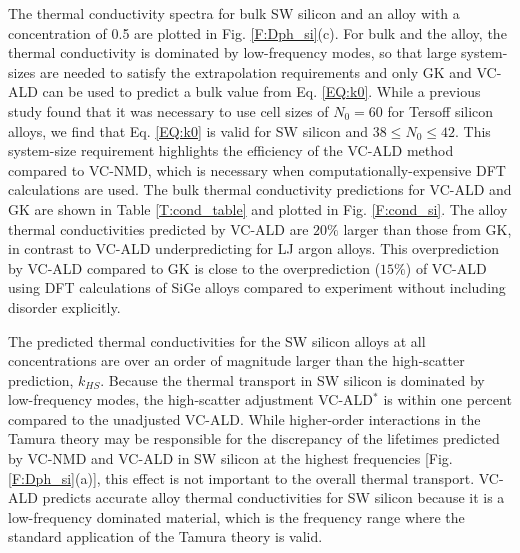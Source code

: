 \documentclass[aps,prb,onecolumn,preprint,footinbib,superscriptaddress,amsmath,amssymb,floatfix]{revtex4}
\begin{document}
The thermal conductivity spectra for bulk SW silicon and an alloy 
with a concentration of 0.5 are plotted in Fig. \ref{F:Dph_si}(c). 
For bulk and the alloy, the thermal conductivity is dominated by 
low-frequency modes, so that large system-sizes are needed to satisfy 
the extrapolation requirements and only GK and VC-ALD can be used to 
predict a bulk value from Eq. \eqref{EQ:k0}. {\color{red} While a previous 
study found that it was necessary to use cell sizes of $N_0 = 60$ for Tersoff silicon 
alloys,\cite{he_morphology_2011} we find that  
Eq. \eqref{EQ:k0} is valid for SW silicon and $38 \le N_0 \le 42$.} 
This system-size requirement highlights the efficiency of the 
VC-ALD method compared to VC-NMD, which is necessary when 
computationally-expensive DFT calculations are used.
\cite{esfarjani_method_2008,garg_role_2011,tian_phonon_2012,lindsay_thermal_2012,esfarjani_heat_2011,chaput_phonon-phonon_2011}
The bulk thermal conductivity 
predictions for VC-ALD and GK are shown in Table \ref{T:cond_table} and 
plotted in Fig. \ref{F:cond_si}. The alloy thermal conductivities predicted 
by VC-ALD are $20\%$ larger than those from GK, in contrast to VC-ALD 
underpredicting for LJ argon alloys. This overprediction 
by VC-ALD compared to GK is close to the overprediction ($15\%$) of VC-ALD 
using DFT calculations of SiGe alloys compared to experiment 
without including disorder explicitly.\cite{garg_role_2011} 

The predicted thermal conductivities for the SW silicon alloys at 
all concentrations are over an order of magnitude larger than
the high-scatter prediction, $k_{HS}$. 
Because the thermal transport in SW silicon 
is dominated by low-frequency modes, the high-scatter adjustment  
VC-ALD$^*$ is within one percent compared 
to the unadjusted VC-ALD. 
While higher-order interactions in the Tamura theory 
may be responsible for the 
discrepancy of the lifetimes predicted by VC-NMD and VC-ALD in SW silicon 
at the highest frequencies [Fig. \ref{F:Dph_si}(a)],  
this effect is not important to the overall
thermal transport. VC-ALD predicts accurate alloy thermal 
conductivities for SW silicon because it is a low-frequency 
dominated material, which is the frequency range where the standard 
application of the Tamura theory is valid.\cite{tamura_isotope_1983} 
\end{document}
